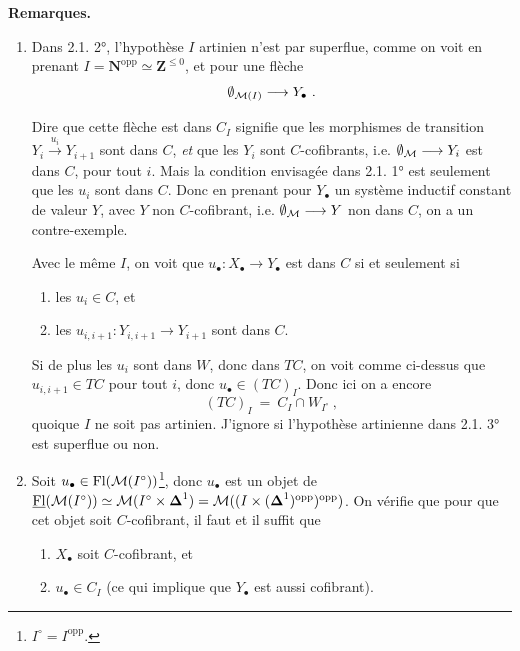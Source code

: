 \noindent\textbf{Remarques.}
\begin{enumerate}[leftmargin=2.5em]
\item[1)] Dans 2.1. 2°, l'hypothèse $I$ artinien n'est par superflue, comme on voit en prenant $I = \mathbf{N}^{\mathrm{opp}} \simeq \mathbf{Z}^{\leq 0}$,  et pour une flèche %
\[ \emptyset_{\mathcal{M}(I)} \longrightarrow Y_\bullet\ . \]

Dire que cette flèche est dans $C_I$ signifie que les morphismes de transition $Y_i \xrightarrow{u_i} Y_{i+1}$ sont dans $C$, \textit{et} que les $Y_i$ sont $C$-cofibrants, i.e. $\emptyset_{\mathcal{M}} \longrightarrow Y_i$ est dans $C$, pour tout $i$. Mais la condition envisagée dans 2.1. 1° est seulement que les $u_i$ sont dans $C$. Donc en prenant pour $Y_\bullet$ un système inductif constant de valeur $Y$, avec $Y$ non $C$-cofibrant, i.e. $\emptyset_{\mathcal{M}} \longrightarrow Y$ non dans $C$, on a un contre-exemple.

Avec le même $I$, on voit que $u_\bullet : X_\bullet \longrightarrow Y_\bullet$ est dans $C$ si et seulement si
\begin{enumerate}[leftmargin=2.5em]
\item[a)] les $u_i \in C$, et
\item[b)] les $u_{i,i+1} : Y_{i,i+1} \longrightarrow Y_{i+1}$ sont dans $C$.
\end{enumerate}


Si de plus les $u_i$ sont dans $W$, donc dans $TC$, on voit comme ci-dessus que $u_{i,i+1} \in TC$ pour tout $i$, donc $u_\bullet \in (TC)_I$. Donc ici on a encore
\[ (TC)_I \ = \ C_I \cap W_{I^\circ}\ , \]
quoique $I$ ne soit pas artinien. J'ignore si l'hypothèse artinienne dans 2.1. 3° est superflue ou non.
\item[2)] Soit $u_\bullet \in \mathrm{Fl}(\mathcal{M}(I^\circ))$\footnote[13]{$I^\circ = I^{\mathrm{opp}}$.}, donc $u_\bullet$ est un objet de $\underline{\mathrm{Fl}}(\mathcal{M}(I^\circ)) \simeq \mathcal{M}(I^\circ \times \boldsymbol{\Delta}^1) = \mathcal{M}((I \times (\boldsymbol{\Delta}^1)^{\mathrm{opp}})^{\mathrm{opp}})$. On vérifie que pour que cet objet soit $C$-cofibrant, il faut et il suffit que
\begin{enumerate}[leftmargin=2.5em]
\item[1°)] $X_\bullet$ soit $C$-cofibrant, et
\item[2°)] $u_\bullet \in C_I$ (ce qui implique que $Y_\bullet$ est aussi cofibrant).
\end{enumerate}
\end{enumerate}

